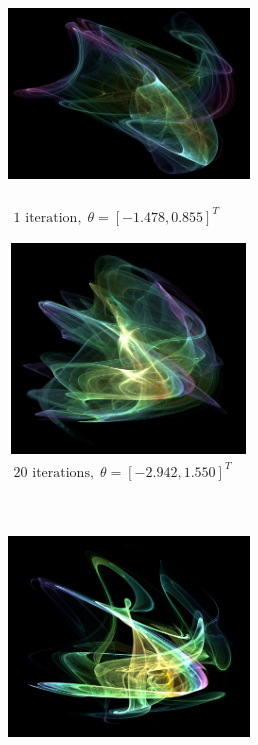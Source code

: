 \begin{figure}[p]
	\centering
	\begin{subfigure}[t]{0.48\textwidth}
		\centering
		\includegraphics[height=5.6cm,width=6.4cm]{chaos/compressed/first_iter_alt.png}
		\caption{{$\begin{array}{c}
				\text{1 iteration}, \; 
				\theta = [-1.478,0.855]^T 
				\end{array}$}}
	\end{subfigure}
	\begin{subfigure}[t]{0.48\textwidth}
		\centering
		\tiny
		\includegraphics[height=5.6cm,width=6.4cm]{chaos/compressed/20_iter_alt.png}
		\caption{{$\begin{array}{c}
				\text{20 iterations}, \; 
				\theta = [-2.942,1.550]^T 
				\end{array}$}}
	\end{subfigure}
	\\
	\vspace{20pt}
	\begin{subfigure}[t]{0.48\textwidth}
		\centering
		\tiny
		\includegraphics[height=5.6cm,width=6.4cm]{chaos/compressed/100_iter_altj.png}

\end{subfigure}
\end{figure}
